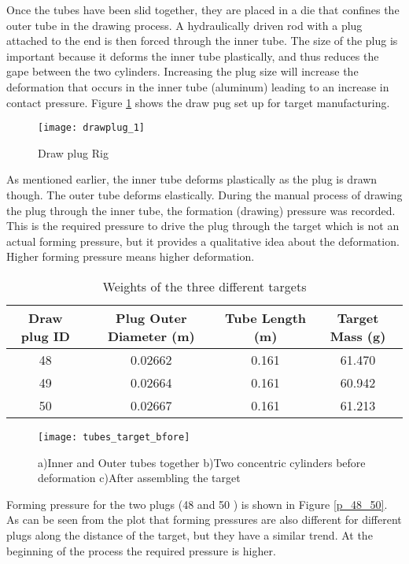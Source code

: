 \begin{doublespacing}
Once the tubes have been slid together, they are placed in a die that confines the outer tube in the drawing process. A hydraulically driven rod with a plug attached to the end is then forced through the inner tube. The size of the plug is important because it deforms the inner tube plastically, and thus reduces the gape between the two cylinders. Increasing the plug size will increase the deformation that occurs in the inner tube (aluminum) leading to an increase in contact pressure. Figure \ref{draw_plug} shows the draw pug set up for target manufacturing. 

\begin{figure}[H]
\centering
\texttt{[image: drawplug\_1]} 
\caption{Draw plug Rig }  
\label{draw_plug} 
\end{figure}

As mentioned earlier, the inner tube deforms plastically as the plug is drawn though.  The outer tube deforms elastically. During the manual process of drawing the plug through the inner tube, the formation (drawing) pressure was recorded. This is the required pressure to drive the plug through the target which is not an actual forming pressure, but it provides a qualitative idea about the deformation. Higher forming pressure means higher deformation.

\begin{table}[H]
\caption{Weights of the three different targets}
\centering
\begin{tabular}{c|c|c|c}
\hline\hline
 Draw plug ID & Plug Outer Diameter (m) & Tube Length (m) & Target Mass (g)  \\
\hline
 48 & 0.02662 & 0.161 & 61.470 \\
 \hline
 49 & 0.02664 & 0.161 & 60.942 \\
 \hline
 50 & 0.02667 & 0.161 & 61.213 \\
 \hline
\end{tabular}
\label{plug_mass}
\end{table}

 \begin{figure}[H]
 \centering
 \texttt{[image: tubes\_target\_bfore]}
 \caption{a)Inner and Outer tubes together b)Two concentric cylinders before deformation c)After assembling the target}
 \label{fig_tubes_target}
 \end{figure}

 Forming pressure for the two plugs (48 and 50 ) is shown in Figure \ref{p_48_50}. As  can be seen from the plot that forming pressures are also different for different plugs along the distance of the target, but they have a similar  trend. At the beginning of the process the required pressure is higher. 


\end{doublespacing}
